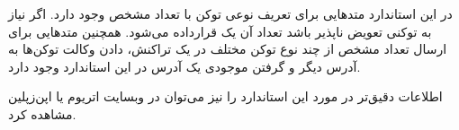 در این استاندارد متدهایی برای تعریف نوعی توکن با تعداد مشخص وجود دارد. اگر نیاز به توکنی تعویض ناپذیر باشد تعداد آن یک قرارداده می‌شود. همچنین متدهایی برای ارسال تعداد مشخص از چند نوع توکن مختلف در یک تراکنش، دادن وکالت توکن‌ها به آدرس دیگر و گرفتن موجودی یک آدرس در این استاندارد وجود دارد.

اطلاعات دقیق‌تر در مورد این استاندارد را نیز می‌توان در وبسایت
اتریوم
یا
اپن‌زپلین
مشاهده کرد.
